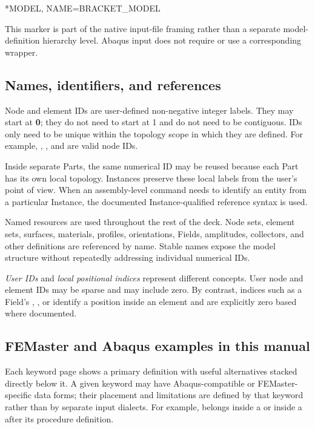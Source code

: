 \begin{syntax}
*MODEL, NAME=BRACKET_MODEL
\end{syntax}

This marker is part of the native input-file framing rather than a separate model-definition hierarchy level. Abaqus input does not require or use a corresponding wrapper.

\subsection{Names, identifiers, and references}

Node and element IDs are user-defined non-negative integer labels. They may start at \textbf{0}; they do not need to start at 1 and do not need to be contiguous. IDs only need to be unique within the topology scope in which they are defined. For example, , , and  are valid node IDs.

Inside separate Parts, the same numerical ID may be reused because each Part has its own local topology. Instances preserve these local labels from the user's point of view. When an assembly-level command needs to identify an entity from a particular Instance, the documented Instance-qualified reference syntax is used.

Named resources are used throughout the rest of the deck. Node sets, element sets, surfaces, materials, profiles, orientations, Fields, amplitudes, collectors, and other definitions are referenced by name. Stable names expose the model structure without repeatedly addressing individual numerical IDs.

\emph{User IDs} and \emph{local positional indices} represent different concepts. User node and element IDs may be sparse and may include zero. By contrast, indices such as a Field's , , or  identify a position inside an element and are explicitly zero based where documented.

\subsection{FEMaster and Abaqus examples in this manual}

Each keyword page shows a primary definition with useful alternatives
stacked directly below it. A given keyword may have Abaqus-compatible
or FEMaster-specific data forms; their placement and limitations are
defined by that keyword rather than by separate input dialects.
For example,  belongs inside a  or inside
a  after its procedure definition.

